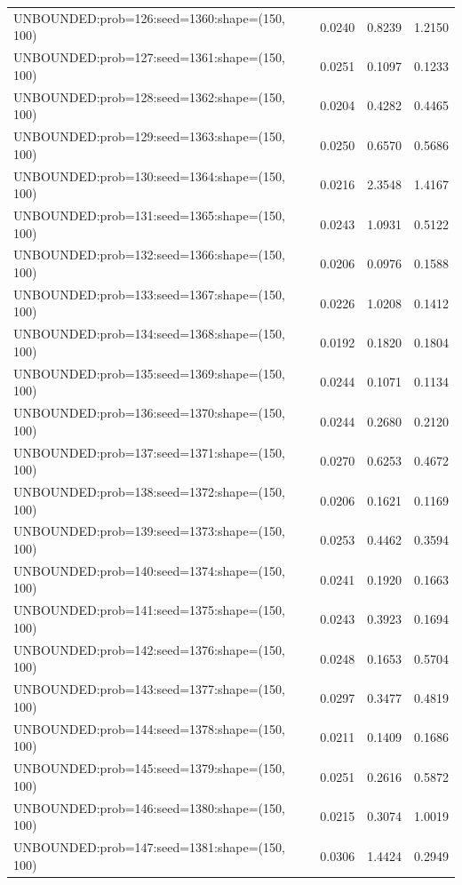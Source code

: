 \begin{longtable}{lccc}
UNBOUNDED:prob=126:seed=1360:shape=(150, 100) &   0.0240 &  0.8239 &  1.2150 \\
UNBOUNDED:prob=127:seed=1361:shape=(150, 100) &   0.0251 &  0.1097 &  0.1233 \\
UNBOUNDED:prob=128:seed=1362:shape=(150, 100) &   0.0204 &  0.4282 &  0.4465 \\
UNBOUNDED:prob=129:seed=1363:shape=(150, 100) &   0.0250 &  0.6570 &  0.5686 \\
UNBOUNDED:prob=130:seed=1364:shape=(150, 100) &   0.0216 &  2.3548 &  1.4167 \\
UNBOUNDED:prob=131:seed=1365:shape=(150, 100) &   0.0243 &  1.0931 &  0.5122 \\
UNBOUNDED:prob=132:seed=1366:shape=(150, 100) &   0.0206 &  0.0976 &  0.1588 \\
UNBOUNDED:prob=133:seed=1367:shape=(150, 100) &   0.0226 &  1.0208 &  0.1412 \\
UNBOUNDED:prob=134:seed=1368:shape=(150, 100) &   0.0192 &  0.1820 &  0.1804 \\
UNBOUNDED:prob=135:seed=1369:shape=(150, 100) &   0.0244 &  0.1071 &  0.1134 \\
UNBOUNDED:prob=136:seed=1370:shape=(150, 100) &   0.0244 &  0.2680 &  0.2120 \\
UNBOUNDED:prob=137:seed=1371:shape=(150, 100) &   0.0270 &  0.6253 &  0.4672 \\
UNBOUNDED:prob=138:seed=1372:shape=(150, 100) &   0.0206 &  0.1621 &  0.1169 \\
UNBOUNDED:prob=139:seed=1373:shape=(150, 100) &   0.0253 &  0.4462 &  0.3594 \\
UNBOUNDED:prob=140:seed=1374:shape=(150, 100) &   0.0241 &  0.1920 &  0.1663 \\
UNBOUNDED:prob=141:seed=1375:shape=(150, 100) &   0.0243 &  0.3923 &  0.1694 \\
UNBOUNDED:prob=142:seed=1376:shape=(150, 100) &   0.0248 &  0.1653 &  0.5704 \\
UNBOUNDED:prob=143:seed=1377:shape=(150, 100) &   0.0297 &  0.3477 &  0.4819 \\
UNBOUNDED:prob=144:seed=1378:shape=(150, 100) &   0.0211 &  0.1409 &  0.1686 \\
UNBOUNDED:prob=145:seed=1379:shape=(150, 100) &   0.0251 &  0.2616 &  0.5872 \\
UNBOUNDED:prob=146:seed=1380:shape=(150, 100) &   0.0215 &  0.3074 &  1.0019 \\
UNBOUNDED:prob=147:seed=1381:shape=(150, 100) &   0.0306 &  1.4424 &  0.2949 \\

\end{longtable}
